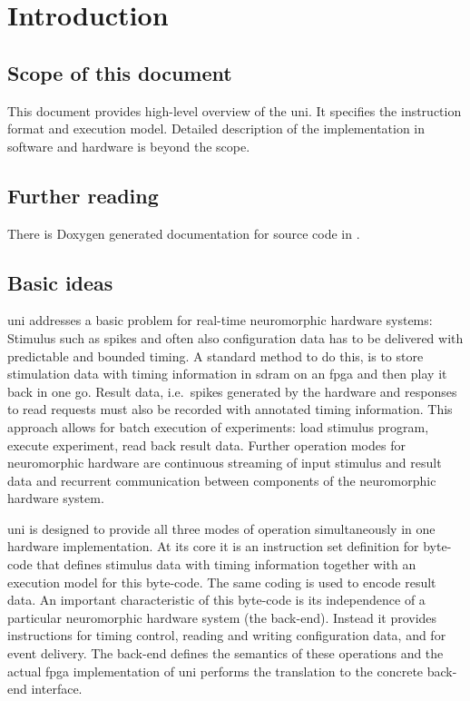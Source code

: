 \chapter{Introduction}

\section{Scope of this document}

This document provides high-level overview of the \gls{uni}.
It specifies the instruction format and execution model.
Detailed description of the implementation in software and hardware is beyond the scope.


\section{Further reading}

There is Doxygen generated documentation for source code in .


\section{Basic ideas}

\Gls{uni} addresses a basic problem for real-time neuromorphic hardware systems:
Stimulus such as spikes and often also configuration data has to be delivered with predictable and bounded timing.
A standard method to do this, is to store stimulation data with timing information in \gls{sdram} on an \gls{fpga} and then play it back in one go.
Result data, i.e.\ spikes generated by the hardware and responses to read requests must also be recorded with annotated timing information.
This approach allows for batch execution of experiments: load stimulus program, execute experiment, read back result data.
Further operation modes for neuromorphic hardware are continuous streaming of input stimulus and result data and recurrent communication between components of the neuromorphic hardware system.

\Gls{uni} is designed to provide all three modes of operation simultaneously in one hardware implementation.
At its core it is an instruction set definition for byte-code that defines stimulus data with timing information together with an execution model for this byte-code.
The same coding is used to encode result data.
An important characteristic of this byte-code is its independence of a particular neuromorphic hardware system (the back-end).
Instead it provides instructions for timing control, reading and writing configuration data, and for event delivery.
The back-end defines the semantics of these operations and the actual \gls{fpga} implementation of \gls{uni} performs the translation to the concrete back-end interface.

